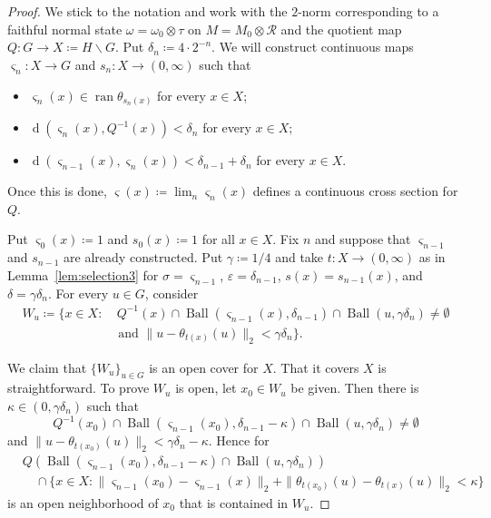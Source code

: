 \documentclass[10pt,a4paper]{amsart}
\DeclareMathOperator{\Ball}{Ball}
\DeclareMathOperator{\dist}{d}
\DeclareMathOperator{\ran}{ran}
\newcommand{\cR}{\mathcal{R}}
\newcommand{\ve}{\varepsilon}
\newcommand{\vs}{\varsigma}
\begin{document}
\begin{proof} 
We stick to the notation and 
work with the $2$-norm 
corresponding to a faithful normal state 
$\omega=\omega_0\otimes\tau$ on $M=M_0\otimes\cR$ 
and the quotient map $Q\colon G\to X\coloneqq H\backslash G$.  
Put $\delta_n\coloneqq 4\cdot 2^{-n}$. 
We will construct continuous maps $\vs_n\colon X\to G$ 
and $s_n\colon X\to(0,\infty)$ such that 
\begin{itemize}
\item
$\vs_n(x)\in\ran\theta_{s_n(x)}$ for every $x\in X$;
\item
$\dist(\vs_n(x),Q^{-1}(x)) < \delta_n$ for every $x\in X$;
\item
$\dist(\vs_{n-1}(x),\vs_{n}(x)) < \delta_{n-1}+\delta_n$ for every $x\in X$.
\end{itemize}
Once this is done, $\vs(x) \coloneqq \lim_n \vs_n(x)$ defines 
a continuous cross section for $Q$.

Put $\vs_0(x)\coloneqq 1$ and $s_0(x)\coloneqq 1$ for all $x\in X$. 
Fix $n$ and suppose that $\vs_{n-1}$ and $s_{n-1}$ are already constructed. 
Put $\gamma\coloneqq 1/4$ and take $t\colon X\to (0,\infty)$ 
as in Lemma~\ref{lem:selection3} for 
$\sigma=\vs_{n-1}$, $\ve=\delta_{n-1}$, $s(x)=s_{n-1}(x)$, and $\delta=\gamma\delta_n$. 
For every $u\in G$, consider 
\begin{align*}
W_u\coloneqq\{ x \in X : &\ Q^{-1}(x) \cap \Ball(\vs_{n-1}(x), \delta_{n-1}) 
 \cap \Ball(u, \gamma\delta_n) \neq\emptyset\\
 &\mbox{ and } \| u - \theta_{t(x)}(u)\|_2 < \gamma\delta_n\}.
\end{align*}

We claim that $\{W_u\}_{u \in G}$ is an open cover for $X$. 
That it covers $X$ is straightforward. 
To prove $W_u$ is open, let $x_0\in W_u$ be given. 
Then there is $\kappa\in(0,\gamma\delta_n)$ such that 
\[
Q^{-1}(x_0) \cap \Ball(\vs_{n-1}(x_0), \delta_{n-1}-\kappa) 
 \cap \Ball(u, \gamma\delta_n) \neq \emptyset
\]
and $\| u - \theta_{t(x_0)}(u)\|_2 < \gamma\delta_n-\kappa$. 
Hence for 
\begin{align*}
&Q(\Ball(\vs_{n-1}(x_0), \delta_{n-1}-\kappa)
 \cap \Ball(u, \gamma\delta_n))\\
 &\quad\cap \{ x\in X : 
  \|\vs_{n-1}(x_0)-\vs_{n-1}(x)\|_2 + \| \theta_{t(x_0)}(u) - \theta_{t(x)}(u)\|_2<\kappa\}
\end{align*}
is an open neighborhood of $x_0$ that is contained in $W_u$. 


\end{proof}
\end{document}
